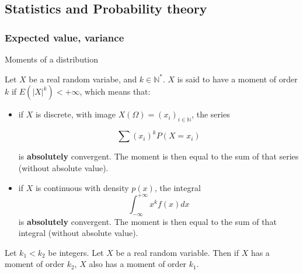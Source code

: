 \documentclass[
10pt, %
a4paper, %
oneside, %
headinclude,footinclude, %
BCOR5mm, %
]{scrartcl}
\begin{document}
\subsection{\large\color{MidnightBlue}Statistics and Probability theory}

\subsubsection{\large\color{Periwinkle}Expected value, variance}

\begin{definition}{Moments of a distribution}

    Let $X$ be a real random variabe, and $k\in \mathbb{N}^*$. $X$ is said to have a moment of order $k$ if $E(|X|^k)<+\infty$, which means that:
    \begin{itemize}
	\item if $X$ is discrete, with image $X(\Omega)=(x_i)_{i\in \mathbb{N} }$, the series

	    \begin{equation*}
		\sum (x_i)^kP(X=x_i)
	    \end{equation*}

	    is \textbf{{absolutely}}  convergent. The moment is then equal to the sum of that series (without absolute value).
	\item if $X$ is continuous with density $p(x)$, the integral
	    \begin{equation*}
	        \int^{+\infty}_{-\infty} x^kf(x)  dx 
	    \end{equation*}
	    is \textbf{{absolutely}}  convergent. The moment is then equal to the sum of that integral (without absolute value).
    \end{itemize}
\end{definition}

\begin{proposition}

    Let $k_1<k_2$ be integers. Let $X$ be a real random variable. Then if $X$ has a moment of order $k_2$, $X$ also has a moment of order $k_1$.
    
\end{proposition}
\end{document}
